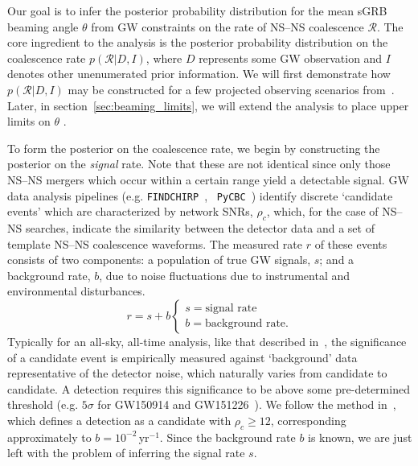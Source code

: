 \documentclass[twocolumn,nofootinbib]{revtex4-1}
\newcommand{\cbcrate}{{{\mathcal R}}}
\newcommand{\BNS}{\ac{NS}--\ac{NS}\xspace}
\newcommand{\arw}[1]{{\color{dgreen}{#1}}}
\begin{document}
Our goal is to infer the posterior probability distribution for the
mean \ac{sGRB} beaming angle $\theta$ from \ac{GW} constraints on the
rate of \BNS coalescence $\cbcrate$.  The core ingredient to the
analysis is the posterior probability distribution on the coalescence
rate $p(\cbcrate|D,I)$, where $D$ represents some \ac{GW} observation
and $I$ denotes other unenumerated prior information.  We will first
demonstrate how $p(\cbcrate|D,I)$ may be constructed for a few
projected observing scenarios from~\cite{Aasi:2013wya}.  Later, in
section~\ref{sec:beaming_limits}, we will extend the analysis to place
upper limits on $\theta$ \arw{based upon the lack of detection during
  O1}.

To form the posterior on the coalescence rate, we begin by
constructing the posterior on the \emph{signal} rate.  Note that these
are not identical since only those \BNS mergers which occur within a
certain range yield a detectable signal.  \ac{GW} data analysis
pipelines (e.g. {\tt FINDCHIRP}~\cite{2012PhRvD..85l2006A}, {\tt
  PyCBC}~\cite{Canton:2014ena,Usman:2015kfa,alex_nitz_2016_197080})
identify discrete `candidate events' which are characterized by
network \acp{SNR}, $\rho_c$, which, for the case of \BNS searches,
indicate the similarity between the detector data and a set of
template \BNS coalescence waveforms.  The measured rate $r$ of these
events consists of two components: a population of true \ac{GW}
signals, $s$; and a background rate, $b$, due to noise fluctuations
due to instrumental and environmental disturbances.
%
\begin{equation}
r = s + b
\begin{cases}
s = \text{signal rate} \\
b = \text{background rate}.
\end{cases}
\end{equation}
%
Typically for an all-sky, all-time analysis, like that described
in~\cite{Usman:2015kfa}, the significance of a candidate event is
empirically measured against `background' data representative of the
detector noise, which naturally varies from candidate to candidate.  A
detection requires this significance to be above some pre-determined
threshold (e.g. $5\sigma$ for GW150914 and
GW151226~\cite{Abbott:2016blz,Abbott:2016nmj}).  We follow the method
in~\cite{Aasi:2013wya}, which defines a detection as a candidate with
$\rho_c \geq 12$, corresponding approximately to
$b=10^{-2}$\,yr$^{-1}$.  Since the background rate $b$ is known, we
are just left with the problem of inferring the signal rate $s$.
\end{document}
